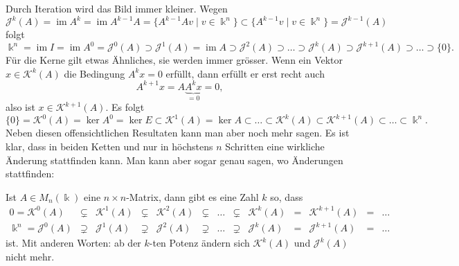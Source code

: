 Durch Iteration wird das Bild immer kleiner.
Wegen
\[
\mathcal{J}^k (A)
=
\operatorname{im} A^k
=
\operatorname{im} A^{k-1} A
=
\{ A^{k-1} Av \mid v \in \Bbbk^n\}
\subset
\{ A^{k-1} v \mid v \in \Bbbk^n\}
=
\mathcal{J}^{k-1}(A)
\]
folgt
\begin{equation}
\Bbbk^n
=
\operatorname{im}I
=
\operatorname{im}A^0
=
\mathcal{J}^0(A)
\supset
\mathcal{J}^1(A)
=
\operatorname{im}A
\supset
\mathcal{J}^2(A)
\supset\dots\supset
\mathcal{J}^k(A)
\supset
\mathcal{J}^{k+1}(A)
\supset \dots \supset
\{0\}.
\label{buch:eigenwerte:eqn:Jkchain}
\end{equation}
Für die Kerne gilt etwas Ähnliches, sie werden immer grösser.
Wenn ein Vektor $x\in \mathcal{K}^k(A)$ die Bedingung $A^kx=0$ erfüllt,
dann erfüllt er erst recht auch
\[
A^{k+1}x=A\underbrace{A^kx}_{\displaystyle=0}=0,
\]
also ist $x\in\mathcal{K}^{k+1}(A)$.
Es folgt
\begin{equation}
\{0\}
=
\mathcal{K}^0(A) = \ker A^0 = \ker E
\subset
\mathcal{K}^1(A) = \ker A
\subset
\dots
\subset
\mathcal{K}^k(A)
\subset
\mathcal{K}^{k+1}(A)
\subset
\dots
\subset
\Bbbk^n.
\label{buch:eigenwerte:eqn:Kkchain}
\end{equation}
Neben diesen offensichtlichen Resultaten kann man aber noch mehr
sagen.
Es ist klar, dass in beiden Ketten
\label{buch:eigenwerte:eqn:Jkchain}
und
\label{buch:eigenwerte:eqn:Kkchain}
nur in höchstens $n$ Schritten eine wirkliche Änderung stattfinden 
kann.
Man kann aber sogar genau sagen, wo Änderungen stattfinden:

\begin{satz}
\label{buch:eigenwerte:satz:ketten}
Ist $A\in M_n(\Bbbk)$ eine $n\times n$-Matrix, dann gibt es eine Zahl $k$
so, dass
\[
\begin{array}{rcccccccccccl}
0=\mathcal{K}^0(A)
&\subsetneq& \mathcal{K}^1(A) &\subsetneq& \mathcal{K}^2(A)
&\subsetneq&\dots&\subsetneq&
\mathcal{K}^k(A) &=& \mathcal{K}^{k+1}(A) &=& \dots
\\
\Bbbk^n= \mathcal{J}^0(A)
&\supsetneq& \mathcal{J}^1(A) &\supsetneq& \mathcal{J}^2(A)
&\supsetneq&\dots&\supsetneq&
\mathcal{J}^k(A) &=& \mathcal{J}^{k+1}(A) &=& \dots
\end{array}
\]
ist.
Mit anderen Worten: ab der $k$-ten Potenz ändern sich
$\mathcal{K}^k(A)$ und $\mathcal{J}^k(A)$ nicht mehr.
\end{satz}

